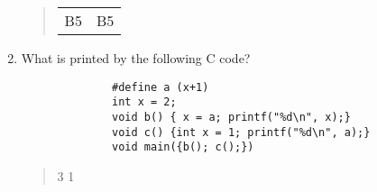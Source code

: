 \documentclass[titlepage]{article}
\begin{document}
\begin{enumerate}
\begin{quote}
\begin{tabular}{r|l}
                  B5                   & B5
              \end{tabular}
          \end{quote}
    \item What is printed by the following C code?
          \begin{verbatim}
              #define a (x+1)
              int x = 2;
              void b() { x = a; printf("%d\n", x);}
              void c() {int x = 1; printf("%d\n", a);}
              void main({b(); c();})
          \end{verbatim}
          \begin{quote}
              3
              1
          \end{quote}
\end{enumerate}
\end{document}
